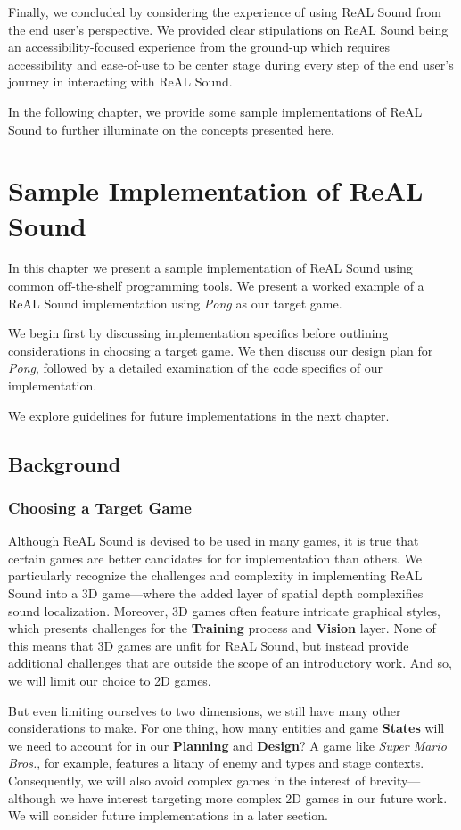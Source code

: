 \documentclass{report}
\newcommand{\rs}{ReAL Sound\xspace}
\newcommand{\plan}{\textbf{Planning}\xspace}
\newcommand{\train}{\textbf{Training}\xspace}
\newcommand{\design}{\textbf{Design}\xspace}
\newcommand{\state}[1]{\textbf{#1}}
\newcommand{\vision}{\textbf{Vision}\xspace}
\begin{document}
Finally, we concluded by considering the experience of using \rs from the end user's perspective. We provided clear stipulations on \rs being an accessibility-focused experience from the ground-up which requires accessibility and ease-of-use to be center stage during every step of the end user's journey in interacting with \rs. 

In the following chapter, we provide some sample implementations of \rs to further illuminate on the concepts presented here.




\chapter{Sample Implementation of \rs}

In this chapter we present a sample implementation of \rs using common off-the-shelf programming tools. We present a worked example of a \rs implementation using \emph{Pong} as our target game.

We begin first by discussing implementation specifics before outlining considerations in choosing a target game. We then discuss our design plan for \emph{Pong}, followed by a detailed examination of the code specifics of our implementation. 

We explore guidelines for future implementations in the next chapter.

\section{Background}
\subsection{Choosing a Target Game}
Although \rs is devised to be used in many games, it is true that certain games are better candidates for for implementation than others. We particularly recognize the challenges and complexity in implementing \rs into a 3D game---where the added layer of spatial depth complexifies sound localization. Moreover, 3D games often feature intricate graphical styles, which presents challenges for the \train process and \vision layer. None of this means that 3D games are unfit for \rs, but instead provide additional challenges that are outside the scope of an introductory work. And so, we will limit our choice to 2D games.

But even limiting ourselves to two dimensions, we still have many other considerations to make. For one thing, how many entities and game \state{States} will we need to account for in our \plan and \design? A game like \emph{Super Mario Bros.}, for example, features a litany of enemy and types and stage contexts. Consequently, we will also avoid complex games in the interest of brevity---although we have interest targeting more complex 2D games in our future work. We will consider future implementations in a later section.
\end{document}

